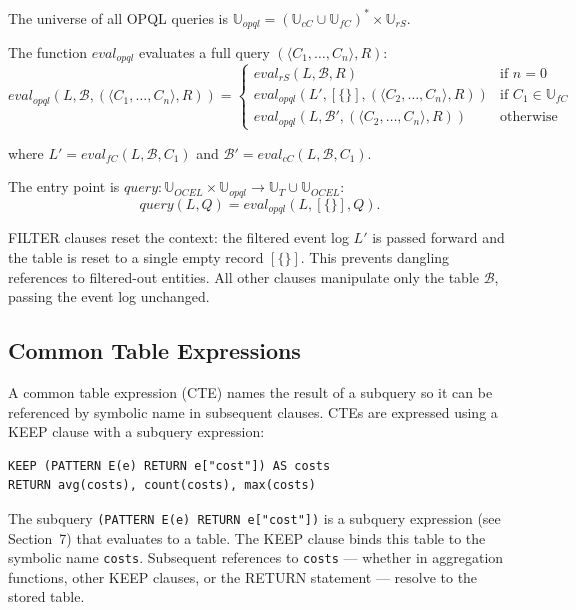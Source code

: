 \begin{frameddef}
The universe of all OPQL queries is $\mathbb{U}_{opql} = (\mathbb{U}_{cC} \cup \mathbb{U}_{fC})^* \times \mathbb{U}_{rS}$.

The function $eval_{opql}$ evaluates a full query $(\langle C_1, \dots, C_n \rangle, R)$:
\[
eval_{opql}(L, \mathcal{B}, (\langle C_1, \dots, C_n \rangle, R)) = \begin{cases}
eval_{rS}(L, \mathcal{B}, R) & \text{if } n = 0 \\
eval_{opql}(L', [\{ \}], (\langle C_2, \dots, C_n \rangle, R)) & \text{if } C_1 \in \mathbb{U}_{fC} \\
eval_{opql}(L, \mathcal{B}', (\langle C_2, \dots, C_n \rangle, R)) & \text{otherwise}
\end{cases}
\]

where $L' = eval_{fC}(L, \mathcal{B}, C_1)$ and $\mathcal{B}' = eval_{cC}(L, \mathcal{B}, C_1)$.

The entry point is $query : \mathbb{U}_{OCEL} \times \mathbb{U}_{opql} \to \mathbb{U}_T \cup \mathbb{U}_{OCEL}$:
\[
query(L, Q) = eval_{opql}(L, [\{ \}], Q).
\]
\end{frameddef}

FILTER clauses reset the context: the filtered event log $L'$ is passed forward and the table is reset to a single empty record $[\{ \}]$. This prevents dangling references to filtered-out entities. All other clauses manipulate only the table $\mathcal{B}$, passing the event log unchanged.

\subsection{Common Table Expressions}

A common table expression (CTE) names the result of a subquery so it can be referenced by symbolic name in subsequent clauses. CTEs are expressed using a KEEP clause with a subquery expression:

\begin{verbatim}
KEEP (PATTERN E(e) RETURN e["cost"]) AS costs
RETURN avg(costs), count(costs), max(costs)
\end{verbatim}

The subquery \texttt{(PATTERN E(e) RETURN e["cost"])} is a subquery expression (see Section~7) that evaluates to a table. The KEEP clause binds this table to the symbolic name \texttt{costs}. Subsequent references to \texttt{costs} --- whether in aggregation functions, other KEEP clauses, or the RETURN statement --- resolve to the stored table.

